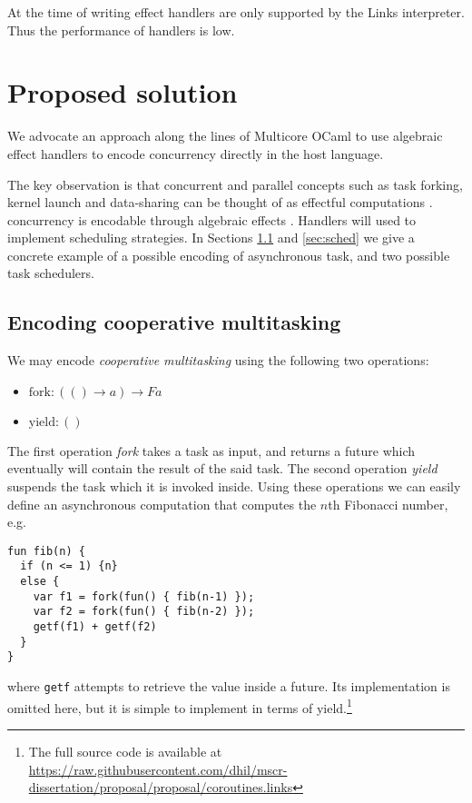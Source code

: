 \documentclass[preprint,10pt,numbers]{sigplanconf}
\begin{document}
At the time of writing effect handlers are only supported by the Links interpreter. Thus the performance of handlers is low.

  \section{Proposed solution}\label{sec:proposedsolution}
We advocate an approach along the lines of Multicore OCaml to use algebraic effect handlers to encode concurrency directly in the host language. 

The key observation is that concurrent and parallel concepts such as task forking, kernel launch and data-sharing can be thought of as effectful computations \cite{Bauer2015,Dolan2015}. concurrency is encodable through algebraic effects \cite{Bauer2015,Dolan2015}. Handlers will used to implement scheduling strategies. In Sections \ref{sec:eff} and \ref{sec:sched} we give a concrete example of a possible encoding of asynchronous task, and two possible task schedulers.

\subsection{Encoding cooperative multitasking}\label{sec:eff}
We may encode \emph{cooperative multitasking} using the following two operations:
\begin{itemize}
  \item $\text{fork} : (() \to a) \to F a$
  \item $\text{yield} : ()$
\end{itemize}
The first operation \emph{fork} takes a task as input, and returns a future which eventually will contain the result of the said task. The second operation \emph{yield} suspends the task which it is invoked inside. Using these operations we can easily define an asynchronous computation that computes the $n$th Fibonacci number, e.g. 
\begin{lstlisting}[style={links},caption={}]
fun fib(n) {
  if (n <= 1) {n}
  else {
    var f1 = fork(fun() { fib(n-1) });
    var f2 = fork(fun() { fib(n-2) });
    getf(f1) + getf(f2)
  }
}
\end{lstlisting}
where \texttt{getf} attempts to retrieve the value inside a future. Its implementation is omitted here, but it is simple to implement in terms of yield.\footnote{The full source code is available at \url{https://raw.githubusercontent.com/dhil/mscr-dissertation/proposal/proposal/coroutines.links}} 
\end{document}
